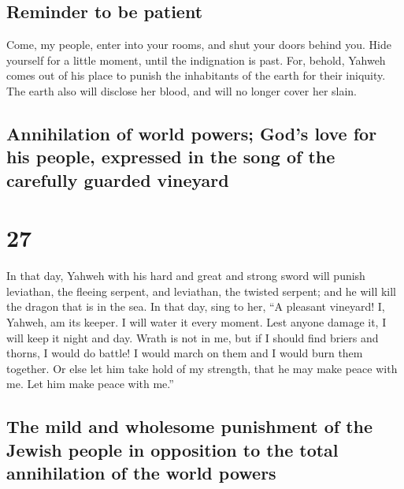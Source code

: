 \hypertarget{reminder-to-be-patient}{%
\subsection{Reminder to be patient}\label{reminder-to-be-patient}}

 Come, my people, enter into your rooms, and shut your
doors behind you. Hide yourself for a little moment, until the
indignation is past.  For, behold, Yahweh comes out of
his place to punish the inhabitants of the earth for their iniquity. The
earth also will disclose her blood, and will no longer cover her slain.

\hypertarget{annihilation-of-world-powers-gods-love-for-his-people-expressed-in-the-song-of-the-carefully-guarded-vineyard}{%
\subsection{Annihilation of world powers; God's love for his people,
expressed in the song of the carefully guarded
vineyard}\label{annihilation-of-world-powers-gods-love-for-his-people-expressed-in-the-song-of-the-carefully-guarded-vineyard}}

\hypertarget{section-26}{%
\section{27}\label{section-26}}

 In that day, Yahweh with his hard and great and strong
sword will punish leviathan, the fleeing serpent, and leviathan, the
twisted serpent; and he will kill the dragon that is in the sea.
 In that day, sing to her, ``A pleasant vineyard!
 I, Yahweh, am its keeper. I will water it every moment.
Lest anyone damage it, I will keep it night and day. 
Wrath is not in me, but if I should find briers and thorns, I would do
battle! I would march on them and I would burn them together.
 Or else let him take hold of my strength, that he may
make peace with me. Let him make peace with me.''

\hypertarget{the-mild-and-wholesome-punishment-of-the-jewish-people-in-opposition-to-the-total-annihilation-of-the-world-powers}{%
\subsection{The mild and wholesome punishment of the Jewish people in
opposition to the total annihilation of the world
powers}\label{the-mild-and-wholesome-punishment-of-the-jewish-people-in-opposition-to-the-total-annihilation-of-the-world-powers}}

